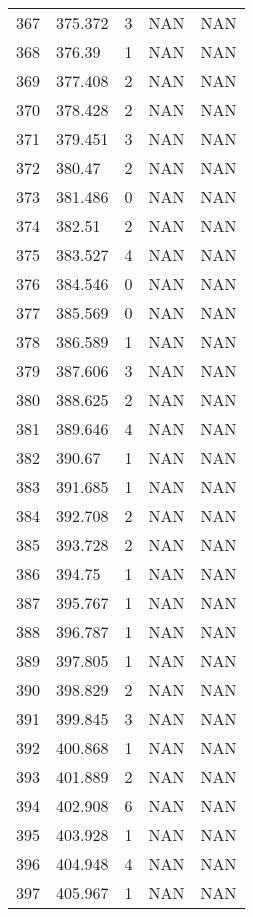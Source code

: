 \documentclass{article}
\begin{document}
\begin{longtable}{@{}lllll@{}}
					367 & 375.372 & 3     & NAN   & NAN   \\
					368 & 376.39  & 1     & NAN   & NAN   \\
					369 & 377.408 & 2     & NAN   & NAN   \\
					370 & 378.428 & 2     & NAN   & NAN   \\
					371 & 379.451 & 3     & NAN   & NAN   \\
					372 & 380.47  & 2     & NAN   & NAN   \\
					373 & 381.486 & 0     & NAN   & NAN   \\
					374 & 382.51  & 2     & NAN   & NAN   \\
					375 & 383.527 & 4     & NAN   & NAN   \\
					376 & 384.546 & 0     & NAN   & NAN   \\
					377 & 385.569 & 0     & NAN   & NAN   \\
					378 & 386.589 & 1     & NAN   & NAN   \\
					379 & 387.606 & 3     & NAN   & NAN   \\
					380 & 388.625 & 2     & NAN   & NAN   \\
					381 & 389.646 & 4     & NAN   & NAN   \\
					382 & 390.67  & 1     & NAN   & NAN   \\
					383 & 391.685 & 1     & NAN   & NAN   \\
					384 & 392.708 & 2     & NAN   & NAN   \\
					385 & 393.728 & 2     & NAN   & NAN   \\
					386 & 394.75  & 1     & NAN   & NAN   \\
					387 & 395.767 & 1     & NAN   & NAN   \\
					388 & 396.787 & 1     & NAN   & NAN   \\
					389 & 397.805 & 1     & NAN   & NAN   \\
					390 & 398.829 & 2     & NAN   & NAN   \\
					391 & 399.845 & 3     & NAN   & NAN   \\
					392 & 400.868 & 1     & NAN   & NAN   \\
					393 & 401.889 & 2     & NAN   & NAN   \\
					394 & 402.908 & 6     & NAN   & NAN   \\
					395 & 403.928 & 1     & NAN   & NAN   \\
					396 & 404.948 & 4     & NAN   & NAN   \\
					397 & 405.967 & 1     & NAN   & NAN   \\

\end{longtable}
\end{document}
